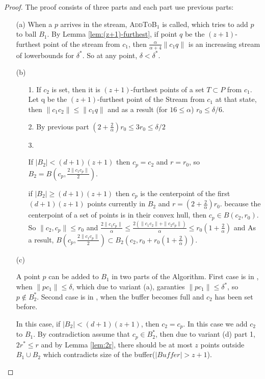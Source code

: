\documentclass[envcountsame]{cls/cccg15}
\newcommand{\dz}{(d + 1)(z + 1)}
\newcommand{\textproc}{\textsc}
\newcommand{\len}[1]{\|{#1}\|}
\newcommand{\lee}{\leqslant}
\newcommand{\gee}{\geqslant}
\renewcommand{\leq}{\lee}
\renewcommand{\le}{\lee}
\renewcommand{\ge}{\gee}
\begin{document}
\begin{proof} The proof consists of three parts and each part use previous parts:
\begin{enumerate}
\item [(a)]{
When a $p$ arrives in the stream, \textproc{AddToB$_1$} is called, which tries to add $p$ to ball $B_1$.
By Lemma \ref{lem:(z+1)-furthest}, if point $q$ be the $(z+1)$-furthest point of the stream from $c_1$,
then $\frac{\alpha}{\alpha+4} \len{c_1q}$ is an increasing stream of lowerbounds for $\delta^*$. So at any point, $\delta < \delta^*$.
} 
\item [(b)]
	\begin{enumerate}
		\item [1.]{ If $c_2$ is set, then it is $(z+1)$-furthest points of a set $T \subset P$ from $c_1$. Let q be the $(z+1)$-furthest point of the Stream from $c_1$ at that state, then $\len{c_1c_2} \leq \len{c_1q}$ and as a result (for $16 \leq \alpha$) $r_0 \leq \delta / 6$.}
		\item [2.] {By previous part $(2 + \frac{2}{\alpha})r_0 \leq 3r_0 \leq \delta /2$}
		\item[3.]{ If $|B_2| < \dz$ then $c_p = c_2$ and $r = r_0$, so $B_2 = B(c_p, \frac{2 \len{c_1 c_p}}{2})$.

				if $|B_2| \ge \dz$ then $c_p$ is the centerpoint of the first $\dz$ points currently in $B_2$ and $r = (2 + \frac{2}{\alpha}) r_0$. because the centerpoint of a set of points is in their convex hull, then $c_p \in B(c_2, r_0)$. So $\len{c_2, c_p} \leq r_0$ and $\frac{2 \len{c_1 c_p}}{\alpha} \leq \frac{2 (\len{c_1 c_2} + \len{c_2 c_p})}{\alpha} \leq r_0(1 + \frac{2}{\alpha})$ and As a result, $B(c_p, \frac{2 \len{c_1 c_p}}{2}) \subset B_2(c_2, r_0 + r_0(1 + \frac{2}{\alpha}))$.}
	\end{enumerate}
\item [(c)] {
A point $p$ can be added to $B_1$ in two parts of the Algorithm. 
First case is in , when  $\len{pc_1} \leq \delta$, which due to variant (a), garanties $\len{pc_1} \le \delta^*$, so $p \not \in B_2^*$.
Second case is in , when the buffer becomes full and $c_2$ has been set before. 

In this case, if $|B_2| < \dz $, then $c_2 = c_p$. In this case we add $c_2$ to $B_1$. By contradiction assume that $c_p \in B_2^*$, then due to variant (d) part 1, $2r^* \leq r$ and by Lemma \ref{lem:2r}, there should be at most $z$ points outside $B_1 \cup B_2$ which contradicts size of the buffer($|Buffer| > z+1$). 

}
\end{enumerate}
\end{proof}
\end{document}
